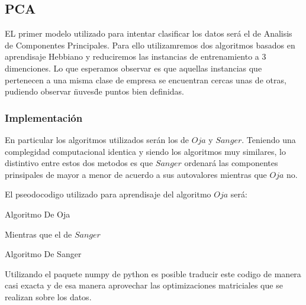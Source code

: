 \subsection{PCA}
EL primer modelo utilizado para intentar clasificar los datos será el de Analisis de Componentes Principales. Para ello utilizamremos dos algoritmos basados en aprendisaje Hebbiano y reduciremos las instancias de entrenamiento a 3 dimenciones. Lo que esperamos observar es que aquellas instancias que pertenecen a una misma clase de empresa se encuentran cercas unas de otras, pudiendo observar \"nuves\" de puntos bien definidas.

\subsubsection{Implementación}

En particular los algoritmos utilizados serán los de $Oja$ y $Sanger$. Teniendo una complegidad computacional identica y siendo los algoritmos muy similares, lo distintivo entre estos dos metodos es que $Sanger$ ordenará las componentes prinsipales de mayor a menor de acuerdo a sus autovalores mientras que $Oja$ no.

El pseodocodigo utilizado para aprendisaje del algoritmo $Oja$ será:

\begin{algorithm}
\begin{algorithmic}[1]\parskip=1mm
 \caption{ Algoritmo De Oja}
\end{algorithmic}
\end{algorithm}

Mientras que el de $Sanger$

\begin{algorithm}
\begin{algorithmic}[1]\parskip=1mm
 \caption{ Algoritmo De Sanger}
\end{algorithmic}
\end{algorithm}

Utilizando el paquete numpy de python es posible traducir este codigo de manera casi exacta y de esa manera aprovechar las optimizaciones matriciales que se realizan sobre los datos.

